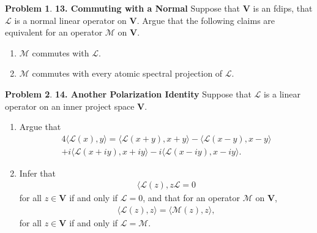 \documentclass{article}
\theoremstyle{definition}
\newtheorem*{prob*}{Problem}
\newcommand{\V}{\mathbf{V}}
\newcommand{\lag}{\mathcal{L}}
\newcommand{\M}{\mathcal{M}}
\newcommand{\la}{\langle}
\newcommand{\ra}{\rangle}
\begin{document}
\newpage




\begin{prob*}\textbf{13. Commuting with a Normal}
	Suppose that $\V$ is an fdips, that $\lag$ is a normal linear operator on $\V$. Argue that the following claims are equivalent for an operator $\M$ on $\V$.
	\begin{enumerate}
		\item $\M$ commutes with $\lag$. 
		\item $\M$ commutes with every atomic spectral projection of $\lag$. 
	\end{enumerate}
	
\end{prob*}




\newpage




\begin{prob*}\textbf{14. Another Polarization Identity} 
	Suppose that $\lag$ is a linear operator on an inner project space $\V$. 
	\begin{enumerate}
		\item Argue that
		\begin{align*}
		4\la \lag(x),y\ra = \la \lag(x+y), x+y\ra - \la \lag(x-y),x-y \ra \\
		+ i\la\lag(x+iy), x+iy \ra -i \la \lag(x-iy), x-iy \ra.
		\end{align*}
		
		
		\item Infer that
		\begin{align*}
		\la \lag(z) ,z \lag = 0
		\end{align*}
		for all $z\in \V$ if and only if $\lag = 0$, and that for an operator $\M$ on $\V$,
		\begin{align*}
		\la \lag(z),z \ra = \la \M(z),z \ra,
		\end{align*}
		for all $z\in \V$ if and only if $\lag = \M$. 
	\end{enumerate}
	
\end{prob*}



\newpage
\end{document}
